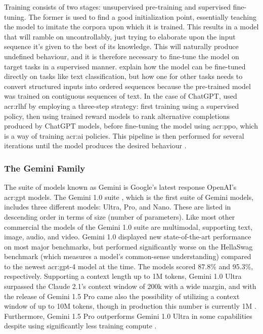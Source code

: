 Training consists of two stages: unsupervised pre-training and supervised fine-tuning. The former is used to find a good initialization point, essentially teaching the model to imitate the corpora upon which it is trained. This results in a model that will ramble on uncontrollably, just trying to elaborate upon the input sequence it's given to the best of its knowledge. This will naturally produce undefined behaviour, and it is therefore necessary to fine-tune the model on target tasks in a supervised manner. \cite[4]{radfordImprovingLanguageUnderstanding2018} explain how the model can be fine-tuned directly on tasks like text classification, but how one for other tasks needs to convert structured inputs into ordered sequences because the pre-trained model was trained on contiguous sequences of text. In the case of ChatGPT, \citeauthor{openaiIntroducingChatGPT2022} used \gls{acr:rlhf} by employing a three-step strategy: first training using a supervised policy, then using trained reward models to rank alternative completions produced by ChatGPT models, before fine-tuning the model using \gls{acr:ppo}, which is a way of training \acrshort{acr:ai} policies. This pipeline is then performed for several iterations until the model produces the desired behaviour \citep{openaiIntroducingChatGPT2022}.

\subsubsection{The Gemini Family}
\label{subsubsec:gemini}

The suite of models known as Gemini is Google's latest response OpenAI's \acrshort{acr:gpt} models. The Gemini 1.0 suite \citep{geminiteamGeminiFamilyHighly2024}, which is the first suite of Gemini models, includes three different models: Ultra, Pro, and Nano. These are listed in descending order in terms of size (number of parameters). Like most other commercial  the models of the Gemini 1.0 suite are multimodal, supporting text, image, audio, and video. Gemini 1.0 displayed new state-of-the-art performance on most major benchmarks, but performed significantly worse on the HellaSwag benchmark (which measures a model's common-sense understanding) compared to the newest \acrshort{acr:gpt}-4 model at the time. The models scored 87.8\% and 95.3\%, respectively. Supporting a context length up to 1M tokens, Gemini 1.0 Ultra surpassed the Claude 2.1's context window of 200k with a wide margin, and with the release of Gemini 1.5 Pro came also the possibility of utilizing a context window of up to 10M tokens, though in production this number is currently 1M \citep{geminiteamGeminiUnlockingMultimodal2024, pichaiOurNextgenerationModel2024}. Furthermore, Gemini 1.5 Pro outperforms Gemini 1.0 Ultra in some capabilities despite using significantly less training compute \citep[31]{geminiteamGeminiUnlockingMultimodal2024}.

